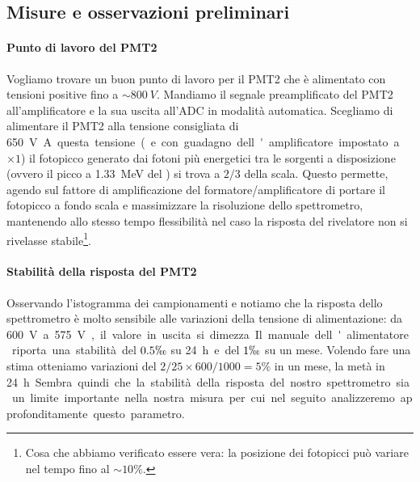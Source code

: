 \subsection{Misure e osservazioni preliminari}

\paragraph{Punto di lavoro del PMT2}
Vogliamo trovare un buon punto di lavoro per il PMT2 che è alimentato con tensioni positive fino a $\sim \SI{800}{V}$. 
Mandiamo il segnale preamplificato del PMT2 all'amplificatore e la sua uscita all'ADC in modalità automatica.
Scegliamo di alimentare il PMT2 alla tensione consigliata di \SI{650}V. A questa tensione (e con guadagno dell'amplificatore impostato a $\times 1$) il fotopicco generato dai fotoni più energetici tra le sorgenti a disposizione (ovvero il picco a \SI{1.33}{MeV} del \co) si trova a $2/3$ della scala. Questo permette, agendo sul fattore di amplificazione del formatore/amplificatore di portare il fotopicco a fondo scala  e massimizzare la risoluzione dello spettrometro, mantenendo allo stesso tempo flessibilità nel caso la risposta del rivelatore non si rivelasse stabile\footnote{Cosa che abbiamo verificato essere vera: la posizione dei fotopicci può variare nel tempo fino al $\sim 10\%$.}.

\paragraph{Stabilità della risposta del PMT2}
Osservando l'istogramma dei campionamenti e notiamo che la risposta dello spettrometro è molto sensibile alle variazioni della tensione di alimentazione: da \SI{600}V a \SI{575}V, il valore in uscita si dimezza.
Il manuale dell'alimentatore riporta una stabilità del $0.5\permil$ su \SI{24}h e del $1\permil$ su un mese. Volendo fare una stima otteniamo variazioni del $2/25 \times 600/1000 = 5\%$ in un mese, la metà in \SI{24}h. Sembra quindi che la stabilità della risposta del nostro spettrometro sia un limite importante nella nostra misura per cui nel seguito analizzeremo approfonditamente questo parametro.

